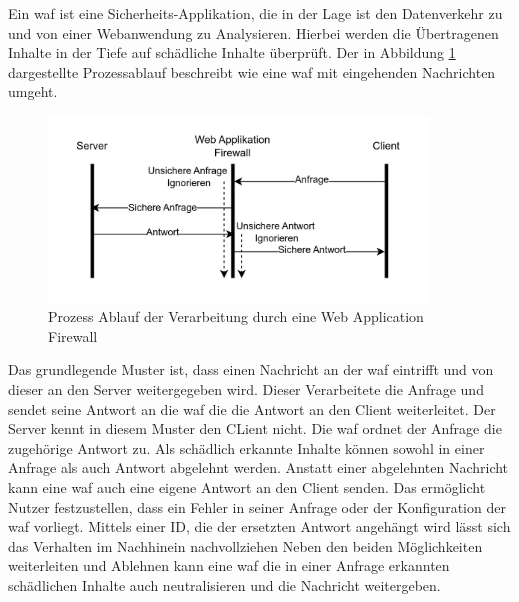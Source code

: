 \label{chap:waf-theory}
Ein \ac{waf} ist eine Sicherheits-Applikation, die in der Lage ist den Datenverkehr zu und von einer Webanwendung zu Analysieren.
Hierbei werden die Übertragenen Inhalte in der Tiefe auf schädliche Inhalte überprüft.
Der in Abbildung \ref{fig:waf-porcess-flow} dargestellte Prozessablauf beschreibt wie eine \ac{waf} mit eingehenden Nachrichten umgeht.

\begin{figure}[!hbt]
    \centering
    \includegraphics[width=0.9\textwidth]{./images/Waf-Process-fliow.png}
    \caption{Prozess Ablauf der Verarbeitung durch eine Web Application Firewall}
    \label{fig:waf-porcess-flow}
\end{figure}

Das grundlegende Muster ist, dass einen Nachricht an der \ac{waf} eintrifft und von dieser an den Server weitergegeben wird.
Dieser Verarbeitete die Anfrage und sendet seine Antwort an die \ac{waf} die die Antwort an den Client weiterleitet.
Der Server kennt in diesem Muster den CLient nicht.
Die \ac{waf} ordnet der Anfrage die zugehörige Antwort zu.
Als schädlich erkannte Inhalte können sowohl in einer Anfrage als auch Antwort abgelehnt werden.
Anstatt einer abgelehnten Nachricht kann eine \ac{waf} auch eine eigene Antwort an den Client senden.
Das ermöglicht Nutzer festzustellen, dass ein Fehler in seiner Anfrage oder der Konfiguration der \ac{waf} vorliegt.
Mittels einer ID, die der ersetzten Antwort angehängt wird lässt sich das Verhalten im Nachhinein nachvollziehen
Neben den beiden Möglichkeiten weiterleiten und Ablehnen kann eine \ac{waf} die in einer Anfrage erkannten schädlichen Inhalte auch neutralisieren und die Nachricht weitergeben.\\

